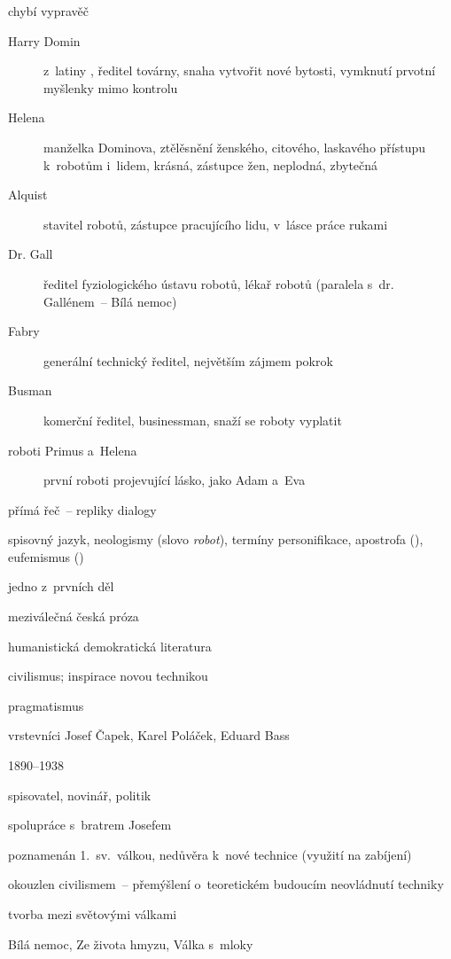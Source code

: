 { %
chybí vypravěč
\begin{description}
\item[Harry Domin] z~latiny , ředitel továrny, snaha vytvořit nové
	bytosti, vymknutí prvotní myšlenky mimo kontrolu
\item[Helena] manželka Dominova, ztělěsnění ženského, citového, laskavého
	přístupu k~robotům i~lidem, krásná, zástupce žen, neplodná, zbytečná
\item[Alquist] stavitel robotů, zástupce pracujícího lidu, v~lásce práce rukami
\item[Dr. Gall] ředitel fyziologického ústavu robotů, lékař robotů (paralela
	s~dr. Gallénem~-- Bílá nemoc)
\item[Fabry] generální technický ředitel, největším zájmem pokrok
\item[Busman] komerční ředitel, businessman, snaží se roboty vyplatit
\item[roboti Primus a~Helena] první roboti projevující lásko, jako Adam a~Eva
\end{description}

přímá řeč~-- repliky
dialogy

\newpart

spisovný jazyk, neologismy (slovo \emph{robot}), termíny
personifikace, apostrofa (), eufemismus ()

\begin{compactitem}
	\item jedno z~prvních děl
	\item meziválečná česká próza
	\item humanistická demokratická literatura
	\item civilismus; inspirace novou technikou
	\item pragmatismus
	\item vrstevníci Josef Čapek, Karel Poláček, Eduard Bass
\end{compactitem}

\parag{\getauthor}
\begin{compactitem}
	\item 1890--1938
	\item spisovatel, novinář, politik
	\item spolupráce s~bratrem Josefem
	\item poznamenán 1.~sv.~válkou, nedůvěra k~nové technice (využití na zabíjení)
	\item okouzlen civilismem~-- přemýšlení o~teoretickém budoucím neovládnutí
		techniky
	\item tvorba mezi světovými válkami
	\item Bílá nemoc, Ze života hmyzu, Válka s~mloky
\end{compactitem}

}
